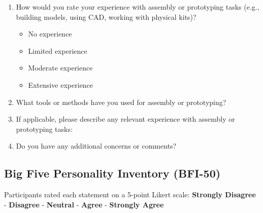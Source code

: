 \begin{enumerate}
    \item How would you rate your experience with assembly or prototyping tasks (e.g., building models, using CAD, working with physical kits)?
    \begin{itemize}
        \item No experience
        \item Limited experience
        \item Moderate experience
        \item Extensive experience
    \end{itemize}
    
    \item What tools or methods have you used for assembly or prototyping? \underline{\hspace{8cm}}
    
    \item If applicable, please describe any relevant experience with assembly or prototyping tasks: \underline{\hspace{8cm}}
    
    \item Do you have any additional concerns or comments? \underline{\hspace{8cm}}
\end{enumerate}

\subsection{Big Five Personality Inventory (BFI-50)}
\label{appendix:big-five}

Participants rated each statement on a 5-point Likert scale: \textbf{Strongly Disagree} - \textbf{Disagree} - \textbf{Neutral} - \textbf{Agree} - \textbf{Strongly Agree}

